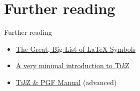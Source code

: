 \documentclass{beamer}
\theoremstyle{definition}
\theoremstyle{remark}
\begin{document}
\section{Further reading}
\begin{frame}{Further reading}
\begin{itemize}
\item \href{https://www3.nd.edu/~nmark/UsefulFacts/LaTeX_symbols.pdf}{The Great, Big List of {\LaTeX} Symbols}
\item \href{https://cremeronline.com/LaTeX/minimaltikz.pdf}{A very minimal introduction to Ti\textit{k}Z}
\item \href{https://mirror.apps.cam.ac.uk/pub/tex-archive/graphics/pgf/base/doc/pgfmanual.pdf}{Ti\textit{k}Z \& PGF Manual} (advanced)
\end{itemize}
\end{frame}
\end{document}
